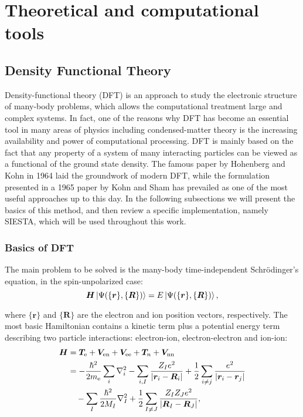
\chapter{Theoretical and computational tools} %

\label{ch2} %


\section{Density Functional Theory}

Density-functional theory (DFT) is an approach to study the electronic structure of many-body problems, which allows the computational treatment large and complex systems. In fact, one of the reasons why DFT has become an essential tool in many areas of physics including condensed-matter theory is the increasing availability and power of computational processing. DFT is mainly based on the fact that any property of a system of many interacting particles can be viewed as a functional of the ground state density\parencite{Martin2004}. The famous paper by Hohenberg and Kohn in 1964\parencite{Hohenberg1964} laid the groundwork of modern DFT, while the formulation presented in a 1965 paper by Kohn and Sham\parencite{Kohn1965} has prevailed as one of the most useful approaches up to this day. In the following subsections we will present the basics of this method, and then review a specific implementation, namely SIESTA, which will be used throughout this work.


\subsection{Basics of DFT}
The main problem to be solved is the many-body time-independent Schrödinger's equation, in the spin-unpolarized case:
\begin{equation}
\bm H \ket{\Psi(\{\bm r\},\{\bm R\})} = E \ket{\Psi(\{\bm r\},\{\bm R\})},
\end{equation}

where \(\{\bm r\}\) and \(\{\bm R\}\) are the electron and ion position vectors, respectively. The most basic Hamiltonian contains a kinetic term plus a potential energy term describing two particle interactions: electron-ion, electron-electron and ion-ion\parencite{Martin2004}:
\begin{equation}
\begin{split}
\bm{H} &= \bm T_{\mathrm e} + \bm V_{\mathrm{en}}+\bm V_{\mathrm{ee}}+\bm T_n+\bm V_{\mathrm{nn}}\\
&= -\frac{\hbar^2}{2m_{\mathrm{e}}}\sum_i\nabla_i^2-\sum_{i,I}\frac{Z_Ie^2}{\abs{\bm r_i-\bm R_i}} + \frac 1 2 \sum_{i\neq j}\frac{e^2}{\abs{\bm r_i-\bm r_j}}\\
&\quad-\sum_I\frac{\hbar^2}{2M_I}\nabla_I^2+\frac 1 2 \sum_{I\neq J}\frac{Z_IZ_Je^2}{\abs{\bm R_I-\bm R_J}},
\end{split}
\end{equation}

